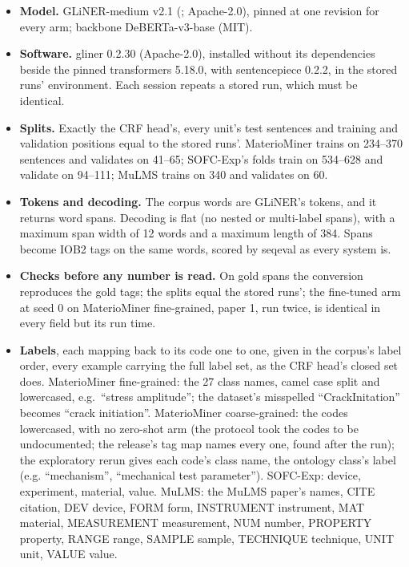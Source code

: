 \documentclass[11pt,a4paper]{article}
\providecommand{\tightlist}{\setlength{\itemsep}{0pt}\setlength{\parskip}{0pt}}
\begin{document}
\begin{itemize}
\tightlist
\item
  \textbf{Model.} GLiNER-medium v2.1 (\citealp{zaratiana2024gliner}; Apache-2.0), pinned
  at one revision for every arm; backbone DeBERTa-v3-base (MIT).
\item
  \textbf{Software.} gliner 0.2.30 (Apache-2.0), installed without its
  dependencies beside the pinned transformers 5.18.0, with sentencepiece
  0.2.2, in the stored runs' environment. Each session repeats a stored
  run, which must be identical.
\item
  \textbf{Splits.} Exactly the CRF head's, every unit's test sentences and
  training and validation positions equal to the stored runs'.
  MaterioMiner trains on 234--370 sentences and validates on 41--65;
  SOFC-Exp's folds train on 534--628 and validate on 94--111; MuLMS trains
  on 340 and validates on 60.
\item
  \textbf{Tokens and decoding.} The corpus words are GLiNER's tokens, and it
  returns word spans. Decoding is flat (no nested or multi-label spans),
  with a maximum span width of 12 words and a maximum length of 384. Spans
  become IOB2 tags on the same words, scored by seqeval as every system
  is.
\item
  \textbf{Checks before any number is read.} On gold spans the conversion
  reproduces the gold tags; the splits equal the stored runs'; the
  fine-tuned arm at seed 0 on MaterioMiner fine-grained, paper 1, run
  twice, is identical in every field but its run time.
\item
  \textbf{Labels}, each mapping back to its code one to one, given in the
  corpus's label order, every example carrying the full label set, as the
  CRF head's closed set does. MaterioMiner fine-grained: the 27 class
  names, camel case split and lowercased, e.g.~``stress amplitude''; the
  dataset's misspelled ``CrackInitation'' becomes ``crack initiation''.
  MaterioMiner coarse-grained: the codes lowercased, with no zero-shot
  arm (the protocol took the codes to be undocumented; the release's
  tag map names every one, found after the run); the exploratory rerun
  gives each code's class name, the ontology class's label (e.g.
  ``mechanism'', ``mechanical test parameter''). SOFC-Exp:
  device, experiment, material, value. MuLMS: the MuLMS paper's names,
  CITE citation, DEV device, FORM form, INSTRUMENT instrument, MAT
  material, MEASUREMENT measurement, NUM number, PROPERTY property, RANGE
  range, SAMPLE sample, TECHNIQUE technique, UNIT unit, VALUE value.

\end{itemize}
\end{document}
